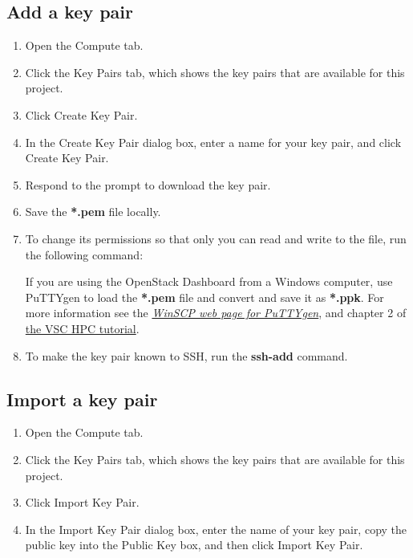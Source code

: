 \subsection*{Add a key pair}\label{add-a-key-pair}
\begin{enumerate}
\item Open the Compute tab.
\item Click the Key Pairs tab, which shows the key pairs that are
  available for this project.
\item Click Create Key Pair.
\item In the Create Key Pair dialog box, enter a name for your key
  pair, and click Create Key Pair.
\item Respond to the prompt to download the key pair.
\item Save the \textbf{*.pem} file locally.
\item To change its permissions so that only you can read and write to
  the file, run the following command:

  \begin{prompt}
  \end{prompt}

   If you are using the \gls{OpenStack Dashboard} from a
  Windows computer, use PuTTYgen to load the \textbf{*.pem} file and
  convert and save it as \textbf{*.ppk}.  For more information see the
  \href{https://winscp.net/eng/docs/ui_puttygen}{\emph{WinSCP web page
      for PuTTYgen}}, and chapter 2 of
  \href{https://www.vscentrum.be/support/tut-book/vsc-tutorials}{the
    VSC HPC tutorial}.

\item To make the key pair known to SSH, run the \textbf{ssh-add}
  command.

  \begin{prompt}
  \end{prompt}
\end{enumerate}

\subsection*{Import a key pair}\label{import-a-key-pair}
\begin{enumerate}
\item Open the Compute tab.
\item Click the Key Pairs tab, which shows the key pairs that are
  available for this project.
\item Click Import Key Pair.
\item In the Import Key Pair dialog box, enter the name of your key
  pair, copy the public key into the Public Key box, and then click
  Import Key Pair.
\end{enumerate}


